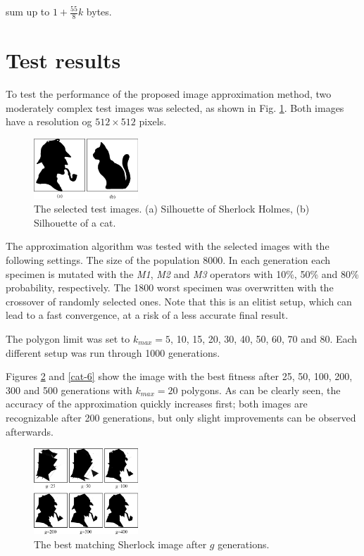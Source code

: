 \documentclass[conference]{IEEEtran}
\begin{document}
sum up to $1+\frac{55}{8}k$ bytes.

\section{Test results}

To test the performance of the proposed image approximation
method, two moderately complex test images was selected,
as shown in Fig. \ref{fig-orig}. Both images have a
resolution og $512 \times 512$ pixels.

\begin{figure}[htbp]
	\centering
	\includegraphics[width=0.35\textwidth]{fig/originals.png}
	\caption{The selected test images.
	(a) Silhouette of Sherlock Holmes,
	(b) Silhouette of a cat.}
	\label{fig-orig}
\end{figure}

The approximation algorithm was tested with the selected
images with the following settings. The size of the population
8000. In each generation each specimen is mutated with the
\emph{M1}, \emph{M2} and \emph{M3} operators with 10\%, 50\%
and 80\% probability, respectively. The 1800 worst specimen
was overwritten with the crossover of randomly selected ones.
Note that this is an elitist setup, which can lead to a fast
convergence, at a risk of a less accurate final result.

The polygon limit was set to $k_{max}=5$, 10, 15, 20, 30, 40, 50,
60, 70 and 80. Each different setup was run through 1000 generations.

Figures \ref{sherlock-6} and \ref{cat-6} show the image with
the best fitness after 25, 50, 100, 200, 300 and 500 generations
with $k_{max}=20$ polygons. As can be clearly seen, the
accuracy of the approximation quickly increases first; both
images are recognizable after 200 generations, but only slight
improvements can be observed afterwards.

\begin{figure}[htbp]
	\centering
	\includegraphics[width=0.35\textwidth]{fig/sherlock6.png}
	\caption{The best matching Sherlock image after $g$ generations.}
	\label{sherlock-6}
\end{figure}
\end{document}
